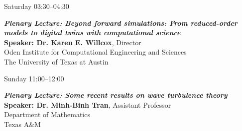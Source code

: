 \documentclass[11pt,oneside,letter]{article}
\begin{document}
\begin{center}
{\large Saturday 03:30--04:30}
\end{center}
\parbox{0.80\textwidth}{{\bfseries\itshape Plenary Lecture: Beyond forward simulations: From reduced-order models to digital twins with com\-pu\-tatio\-nal science}\\
{\bf Speaker: Dr. Karen E. Willcox}, Director\\
\hspace*{1.7cm}Oden Institute for Computational Engineering and Sciences\\
\hspace*{1.7cm}The University of Texas at Austin
}\hspace{0.20\textwidth}\vspace{3ex}


\begin{center}
{\large Sunday 11:00--12:00}
\end{center}
\parbox{0.94\textwidth}{{\bfseries\itshape Plenary Lecture: Some recent results on wave turbulence theory}\\
{\bf Speaker: Dr. Minh-Binh Tran}, Assistant Professor\\
\hspace*{1.7cm}Department of Mathematics\\
\hspace*{1.7cm}Texas A\&M
}
\end{document}
